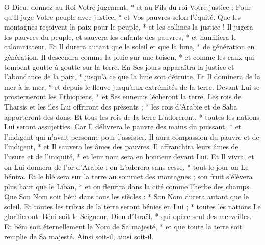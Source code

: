  O Dieu, donnez au Roi Votre jugement, * et au Fils du roi Votre justice ;
\versseparator
 Pour qu'Il juge Votre peuple avec justice, * et Vos pauvres selon l'équité.
\versseparator
 Que les montagnes reçoivent la paix pour le peuple, * et les collines la justice !
\versseparator
 Il jugera les pauvres du peuple, et sauvera les enfants des pauvres, * et humiliera le calomniateur.
\versseparator
 Et Il durera autant que le soleil et que la lune, * de génération en génération.
\versseparator
 Il descendra comme la pluie sur une toison, * et comme les eaux qui tombent goutte à goutte sur la terre.
\versseparator
 En Ses jours apparaîtra la justice et l'abondance de la paix, * jusqu'à ce que la lune soit détruite.
\versseparator
 Et Il dominera de la mer à la mer, * et depuis le fleuve jusqu'aux extrémités de la terre.
\versseparator
 Devant Lui se prosterneront les Ethiopiens, * et Ses ennemis lécheront la terre.
\versseparator
 Les rois de Tharsis et les îles Lui offriront des présents ; * les rois d'Arabie et de Saba apporteront des dons;
\versseparator
 Et tous les rois de la terre L'adoreront, * toutes les nations Lui seront assujetties.
\versseparator
 Car Il délivrera le pauvre des mains du puissant, * et l'indigent qui n'avait personne pour l'assister.
\versseparator
 Il aura compassion du pauvre et de l'indigent, * et Il sauvera les âmes des pauvres.
\versseparator
 Il affranchira leurs âmes de l'usure et de l'iniquité, * et leur nom sera en honneur devant Lui.
\versseparator
 Et Il vivra, et on Lui donnera de l'or d'Arabie ; on L'adorera sans cesse, * tout le jour on Le bénira.
\versseparator
 Et le blé sera sur la terre au sommet des montagnes ; son fruit s'élèvera plus haut que le Liban, * et on fleurira dans la cité comme l'herbe des champs.
\versseparator
 Que Son Nom soit béni dans tous les siècles : * Son Nom durera autant que le soleil.
\versseparator
 Et toutes les tribus de la terre seront bénies en Lui ; * toutes les nations Le glorifieront.
\versseparator
 Béni soit le Seigneur, Dieu d'Israël, * qui opère seul des merveilles.
\versseparator
 Et béni soit éternellement le Nom de Sa majesté, * et que toute la terre soit remplie de Sa majesté. Ainsi soit-il, ainsi soit-il.